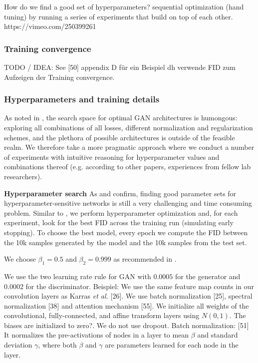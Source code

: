 \documentclass[12pt,a4paper]{article}
\begin{document}
\par How do we find a good set of hyperparameters? sequential optimization (hand tuning) by running a series of experiments that build on top of each other. https://vimeo.com/250399261

\subsubsection{Training convergence}
TODO / IDEA: See [50] appendix D für ein Beispiel dh verwende FID zum Aufzeigen der Training convergence.


\subsubsection{Hyperparameters and training details}
As noted in \cite{GANLandscape}, the search space for optimal GAN architectures is humongous: exploring all combinations of all losses, different normalization and regularization schemes, and the plethora of possible architectures is outside of the feasible realm. We therefore take a more pragmatic approach where we conduct a number of experiments with intuitive reasoning for hyperparameter values and combinations thereof (e.g. according to other papers, experiences from fellow lab researchers).

\textbf{Hyperparameter search} As \cite{SpatialBDecoder} and \cite{ChallCmonAssInUnLearOfDR} confirm, finding good parameter sets for hyperparameter-sensitive networks is still a very challenging and time consuming problem. Similar to \cite{AreGANsEqual}, we perform hyperparameter optimization and, for each experiment, look for the best FID across the training run (simulating early stopping). To choose the best model, every epoch we compute the FID between the 10k samples generated by the model and the 10k samples from the test set.

We choose $\beta_1 = 0.5$ and $\beta_2 = 0.999$ as recommended in \cite{GANLandscape}.

We use the two learning rate rule for GAN \cite{TTUR} with $0.0005$ for the generator and $0.0002$ for the discriminator.
Beispiel: We use the same feature map counts in our convolution layers as Karras \textit{et al.} [26]. We use batch normalization [25], spectral normalization [38] and attention mechanism [55].
We initialize all weights of the convolutional, fully-connected, and affine transform layers using $N(0, 1)$. The biases are initialized to zero?.
We do not use dropout.
Batch normalization: [51] It normalizes the pre-activations of nodes in a layer to mean $\beta$ and standard deviation $\gamma$, where both $\beta$ and $\gamma$ are parameters learned for each node in the layer.
\end{document}

